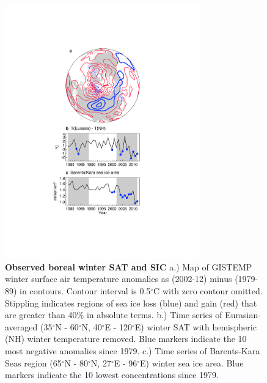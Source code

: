 \documentclass{nature}
\begin{document}
\begin{figure}%
\centering
\noindent\includegraphics[width=20pc]{Word/Figure_1.pdf}
\caption{\textbf{Observed boreal winter SAT and SIC} a.) Map of GISTEMP winter surface air temperature anomalies as (2002-12) minus (1979-89) in contours. Contour interval is 0.5$^\circ$C with zero contour omitted. Stippling indicates regions of sea ice loss (blue) and gain (red) that are greater than 40\% in absolute terms. b.) Time series of Eurasian-averaged (35$^\circ$N - 60$^\circ$N, 40$^\circ$E - 120$^\circ$E) winter SAT with hemispheric (NH) winter temperature removed. Blue markers indicate the 10 most negative anomalies since 1979. c.) Time series of Barents-Kara Seas region (65$^\circ$N - 80$^\circ$N, 27$^\circ$E - 96$^\circ$E) winter sea ice area. Blue markers indicate the 10 lowest concentrations since 1979.
}
\label{fig:fig1} 
\end{figure}
\end{document}
